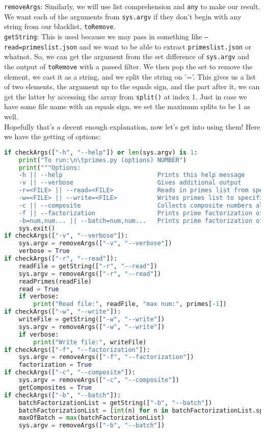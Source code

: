 \documentclass[12pt]{article}
\begin{document}
\texttt{removeArgs}: Similarly, we will use list comprehension and \texttt{any} to make our result. We want each of the arguments from \texttt{sys.argv} if they don't begin with any string from our blacklist, \texttt{toRemove}.\\
\texttt{getString}: This is used because we may pass in something like \texttt{--read=primeslist.json} and we want to be able to extract \texttt{primeslist.json} or whatnot. So, we can get the argument from the set difference of \texttt{sys.argv} and the output of \texttt{toRemove} with a passed filter. We then pop the set to remove the element, we cast it as a string, and we split the string on '='. This gives us a list of two elements, the argument up to the equals sign, and the part after it, we can get the latter by accessing the array from \texttt{split()} at index 1. Just in case we have some file name with an equals sign, we set the maximum splits to be 1 as well.\\
Hopefully that's a decent enough explanation, now let's get into using them! Here we have the getting of options:\\
\begin{lstlisting}[language=Python]
if checkArgs(["-h", "--help"]) or len(sys.argv) is 1:
    print("To run:\n\tprimes.py (options) NUMBER")
    print("""Options:
    -h || --help                          Prints this help message
    -v || --verbose                       Gives additional output
    -r=<FILE> || --read=<FILE>            Reads in primes list from specified file (JSON)
    -w=<FILE> || --write=<FILE>           Writes primes list to specified file (JSON)
    -c || --composite                     Collects composite numbers also
    -f || --factorization                 Prints prime factorization of NUMBER
    -b=num,num... || --batch=num,num...   Prints prime factorization of num,num,num...""")
    sys.exit()
if checkArgs(["-v", "--verbose"]):
    sys.argv = removeArgs(["-v", "--verbose"])
    verbose = True
if checkArgs(["-r", "--read"]):
    readFile = getString(["-r", "--read"])
    sys.argv = removeArgs(["-r", "--read"])
    readPrimes(readFile)
    read = True
    if verbose:
        print("Read file:", readFile, "max num:", primes[-1])
if checkArgs(["-w", "--write"]):
    writeFile = getString(["-w", "--write"])
    sys.argv = removeArgs(["-w", "--write"])
    if verbose:
        print("Write file:", writeFile)
if checkArgs(["-f", "--factorization"]):
    sys.argv = removeArgs(["-f", "--factorization"])
    factorization = True
if checkArgs(["-c", "--composite"]):
    sys.argv = removeArgs(["-c", "--composite"])
    getComposites = True
if checkArgs(["-b", "--batch"]):
    batchFactorizationList = getString(["-b", "--batch"])
    batchFactorizationList = [int(n) for n in batchFactorizationList.split(",")]
    maxOfBatch = max(batchFactorizationList)
    sys.argv = removeArgs(["-b", "--batch"])
\end{lstlisting}
\end{document}

